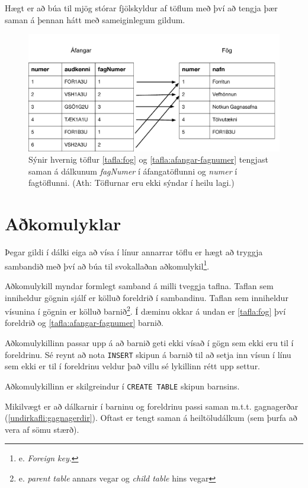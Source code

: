 Hægt er að búa til mjög stórar fjölskyldur af töflum með því að tengja þær saman á þennan hátt með sameiginlegum gildum.

\begin{figure}
\caption[Tengsl taflna]{Sýnir hvernig töflur \ref{tafla:fog} og \ref{tafla:afangar-fagnumer} tengjast saman á dálkunum \emph{fagNumer} í áfangatöflunni og \emph{numer} í fagtöflunni. (Ath: Töflurnar eru ekki sýndar í heilu lagi.)}
\label{mynd:tengsl}
\centering
\includegraphics[width=\linewidth]{myndir/foreign-key}
\end{figure}

\section{Aðkomulyklar} %
Þegar gildi í dálki eiga að vísa í línur annarrar töflu er hægt að tryggja sambandið með því að búa til svokallaðan aðkomulykil\footnote{e. \emph{Foreign key}.}.

Aðkomulykill myndar formlegt samband á milli tveggja taflna. Taflan sem inniheldur gögnin sjálf er kölluð foreldrið í sambandinu. Taflan sem inniheldur vísunina í gögnin er kölluð barnið\footnote{e. \emph{parent table} annars vegar og \emph{child table} hins vegar}. Í dæminu okkar á undan er \ref{tafla:fog} því foreldrið og \ref{tafla:afangar-fagnumer} barnið.

Aðkomulykillinn passar upp á að barnið geti ekki vísað í gögn sem ekki eru til í foreldrinu. Sé reynt að nota \verb|INSERT| skipun á barnið til að setja inn vísun í línu sem ekki er til í foreldrinu veldur það villu sé lykillinn rétt upp settur.

Aðkomulykillinn er skilgreindur í \verb|CREATE TABLE| skipun barnsins.

Mikilvægt er að dálkarnir í barninu og foreldrinu passi saman m.t.t. gagnagerðar (\ref{undirkafli:gagnagerdir}). Oftast er tengt saman á heiltöludálkum (sem þurfa að vera af sömu stærð).


